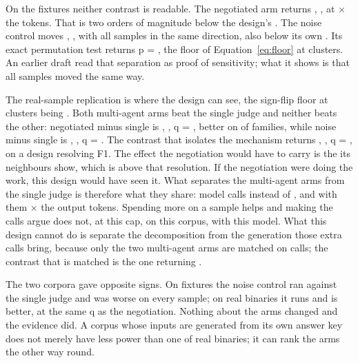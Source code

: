 On the fixtures neither contrast is readable. The negotiated arm returns , , at
$\times$ the tokens. That is two orders of magnitude below the design's
. The noise control moves ,
, with all  samples in the same direction, also
below its own . Its exact permutation test returns p = , the floor of
Equation~\eqref{eq:floor} at  clusters. An earlier draft read that
separation as proof of sensitivity; what it shows is that all samples moved the same way.

The real-sample replication is where the design can see, the sign-flip floor at
 clusters being . Both multi-agent arms beat
the single judge and neither beats the other: negotiated minus single is
, , q = , better
on  of  families, while noise minus single
is , , q = . The contrast that isolates the mechanism returns ,
, q = , on a design resolving
 F1. The effect the negotiation would have to carry is the  its neighbours
show, which is above that resolution. If the negotiation were doing the work, this design would have
seen it. What separates the multi-agent arms from the single judge is therefore what they share:
 model calls instead of ,
and with them $\times$ the output tokens. Spending more on a
sample helps and making the calls argue does not, at this cap, on this corpus, with this model. What
this design cannot do is separate the decomposition from the generation those extra calls bring,
because only the two multi-agent arms are matched on calls; the contrast that is matched is the one
returning .

The two corpora gave opposite signs. On fixtures the noise control ran  against the single judge and
was worse on every sample; on real binaries it runs  and is better, at the
same q as the negotiation. Nothing about the arms changed and the evidence did. A corpus whose
inputs are generated from its own answer key does not merely have less power than one of real
binaries; it can rank the arms the other way round.

